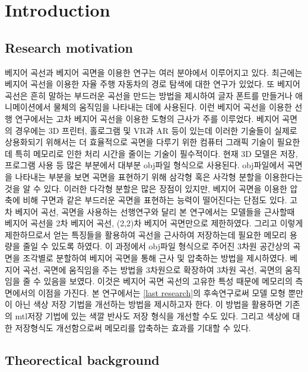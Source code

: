 \documentclass{gshs_thesis}
\theoremstyle{theorem}
\theoremstyle{lemma}
\theoremstyle{definition}
\begin{document}
\section{Introduction}
\subsection{Research motivation}
베지어 곡선과 베지어 곡면을 이용한 연구는 여러 분야에서 이루어지고 있다. 최근에는 베지어 곡선을 이용한 자율 주행 자동차의 경로 탐색에 대한 연구가 있었다.\cite{Ji-wung Choi} 또 베지어 곡선은 흔히 말하는 부드러운 곡선을 만드는 방법을 제시하여 글자 폰트를 만들거나 애니메이션에서 물체의 움직임을 나타내는 데에 사용된다.\cite{Hazewinkel} 이런 베지어 곡선을 이용한 선행 연구에서는 고차 베지어 곡선을 이용한 도형의 근사가 주를 이루었다.\cite{Seon-Hong Kim,Forrest} 베지어 곡면의 경우에는 3D 프린터, 홀로그램 및 VR과 AR 등이 있는데 이러한 기술들이 실제로 상용화되기 위해서는 더 효율적으로 곡면을 다루기 위한 컴퓨터 그래픽 기술이 필요한데 특히 메모리로 인한 처리 시간을 줄이는 기술이 필수적이다. 현재 3D 모델은 저장, 프로그램 사용 등 많은 부분에서 대부분 obj파일 형식으로 사용된다. obj파일에서 곡면을 나타내는 부분을 보면 곡면을 표현하기 위해 삼각형 혹은 사각형 분할을 이용한다는 것을 알 수 있다. 이러한 다각형 분할은 많은 장점이 있지만, 베지어 곡면을 이용한 압축에 비해 구면과 같은 부드러운 곡면을 표현하는 능력이 떨어진다는 단점도 있다. 고차 베지어 곡선, 곡면을 사용하는 선행연구와 달리  본 연구에서는 모델들을 근사할때 베지어 곡선을 2차 베지어 곡선, (2,2)차 베지어 곡면만으로 제한하였다. 그리고 이렇게 제한하므로서 얻는 특징들을 활용하여 곡선을 근사하여 저장하는데 필요한 메모리 용량을 줄일 수 있도록 하였다.  이 과정에서 obj파일 형식으로 주어진 3차원 공간상의 곡면을 조각별로 분할하여 베지어 곡면을 통해 근사 및 압축하는 방법을 제시하였다. 베지어 곡선, 곡면에 움직임을 주는 방법을 3차원으로 확장하여 3차원 곡선, 곡면의 움직임을 줄 수 있음을 보였다.\cite{Bezier Polynomial}  이것은 베지어 곡면 곡선의 고유한 특성 때문에 메모리의 측면에서의 이점을 가진다. 본 연구에서는 \cref{last research}의 후속연구로써 모델 모형 뿐만이 아닌 색상 저장 기법을 개선하는 방법을 제시하고자 한다. 이 방법을 활용하면 기존의 mtl저장 기법에 있는 색깔 반사도 저장 형식을 개선할 수도 있다. 그리고 색상에 대한 저장형식도 개선함으로써 메모리를 압축하는 효과를 기대할 수 있다.
\subsection{Theorectical background}
\end{document}
